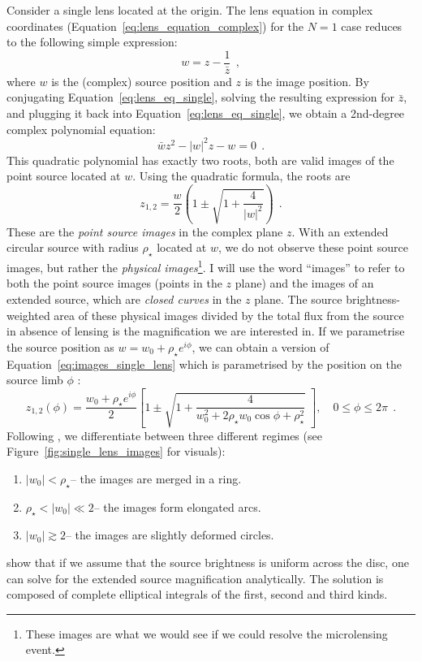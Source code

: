 \documentclass[12pt,dvipsnames]{report}
\newcommand{\hquad}{~~}
\begin{document}
Consider a single lens located at the origin. The lens equation in complex
coordinates (Equation~\ref{eq:lens_equation_complex}) for the $N=1$ case
reduces to the following simple expression:
\begin{equation}
    w = z - \frac{1}{\bar{z}}
    \hquad,
    \label{eq:lens_eq_single}
\end{equation}
where $w$ is the (complex) source position and $z$ is the image position.
By conjugating Equation~\ref{eq:lens_eq_single}, solving the resulting expression
for $\bar{z}$, and plugging it back into Equation~\ref{eq:lens_eq_single}, we
obtain a 2nd-degree complex polynomial equation:
\begin{equation}
    \bar{w}z^2-|w|^2 z - w = 0
    \hquad.
    \label{eq:complex_poly_single}
\end{equation}
This quadratic polynomial has exactly two roots, both are valid images
of the point source located at $w$. Using the quadratic formula, the roots are
\begin{equation}
    z_{1,2} = \frac{w}{2}\left(1 \pm \sqrt{1 +\frac{4}{|w|^2}}\right)
    \hquad.
    \label{eq:images_single_lens}
\end{equation}
These are the \emph{point source images} in the complex plane $z$. With an 
extended circular source
with radius $\rho_\star$ located at $w$, we do not observe these point source
images, but rather the \emph{physical images}\footnote{These images are what we would
    see if we could resolve the microlensing event.}. I will use the word ``images''
to refer to both the point source images (points in the $z$ plane) and
the images of an extended source, which are \emph{closed curves} in the $z$ plane.
The source brightness-weighted area of these physical images divided by the total flux
from the source in absence of lensing is the magnification we are interested in.
If we parametrise the source  position as $w=w_0+\rho_\star e^{i\phi}$, we
can obtain a version of Equation~\ref{eq:images_single_lens} which is parametrised by
the position on the source limb $\phi$ \citep{1994ApJ...430..505W}:
\begin{equation}
    z_{1,2}(\phi)=\frac{w_0+\rho_\star e^{i \phi}}{2}\left[1 \pm \sqrt{1+\frac{4}{w_0^{2}+2 \rho_\star
    w_0 \cos \phi+\rho_\star^{2}}}\;\right], \quad 0 \leq \phi\leq 2 \pi
    \hquad.
\end{equation}
Following \citet{1994ApJ...430..505W}, we  differentiate between  three different
regimes (see Figure~\ref{fig:single_lens_images} for visuals):
\begin{enumerate}
    \item   $|w_0| < \rho_\star$-- the images are merged in a ring.
    \item   $\rho_\star < |w_0| \ll 2$-- the images form elongated arcs.
    \item   $|w_0| \gtrsim  2$-- the images are slightly deformed  circles.
\end{enumerate}
\citet{1994ApJ...430..505W} show that if we assume that the source brightness is
uniform across the disc, one can solve for the extended source magnification analytically.
The solution is composed of complete elliptical integrals of the first, second
and third kinds.
\end{document}
